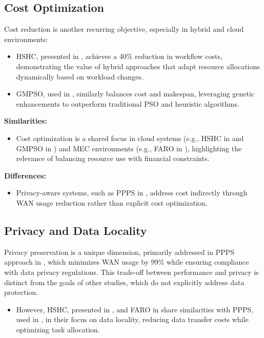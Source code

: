 \documentclass[a4paper, final]{article}
\begin{document}
\subsection{Cost Optimization}
Cost reduction is another recurring objective, especially in hybrid and cloud environments:
\begin{itemize}
    \item HSHC, presented in \cite{bib:9}, achieves a 40\% reduction in workflow costs, demonstrating the 
    value of hybrid approaches that adapt resource allocations dynamically based on workload changes.

    \item GMPSO, used in \cite{bib:10}, similarly balances cost and makespan, leveraging genetic enhancements 
    to outperform traditional PSO and heuristic algorithms.
\end{itemize}

\noindent \textbf{Similarities:}
\begin{itemize}
    \item Cost optimization is a shared focus in cloud systems (e.g., HSHC in \cite{bib:9} and GMPSO in \cite{bib:10})
    and MEC environments (e.g., FARO in \cite{bib:2_faro}), highlighting the relevance of balancing resource use with financial 
    constraints.
\end{itemize}

\noindent \textbf{Differences:}
\begin{itemize}
    \item Privacy-aware systems, such as PPPS in \cite{bib:7_ppps}, address cost indirectly 
    through WAN usage reduction rather than explicit cost optimization.
\end{itemize}

\subsection{Privacy and Data Locality}
Privacy preservation is a unique dimension, primarily addressed in PPPS approach in \cite{bib:7_ppps}, 
which minimizes WAN usage by 99\% while ensuring compliance with data privacy regulations. This 
trade-off between performance and privacy is distinct from the goals of other studies, which do not 
explicitly address data protection.
\begin{itemize}
    \item However, HSHC, presented in \cite{bib:9}, and FARO in \cite{bib:2_faro} share similarities 
    with PPPS, used in \cite{bib:7_ppps}, in their focus on data locality, reducing data transfer costs while 
    optimizing task allocation.
\end{itemize}
\end{document}
